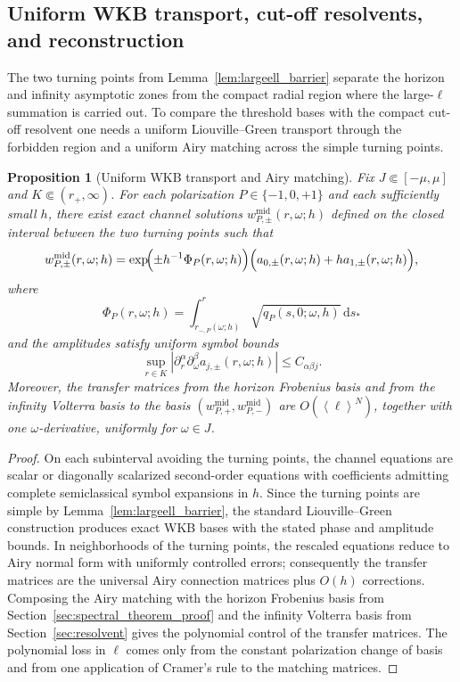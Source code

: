 \documentclass[12pt]{article}
\numberwithin{equation}{section}
\theoremstyle{plain}
\newtheorem{proposition}[theorem]{Proposition}
\theoremstyle{definition}
\theoremstyle{remark}
\newcommand{\dd}{\mathrm d}
\newcommand{\om}{\omega}
\newcommand{\angles}[1]{\left\langle #1 \right\rangle}
\newcommand{\abs}[1]{\left|#1\right|}
\begin{document}
\subsection{Uniform WKB transport, cut-off resolvents, and reconstruction}

The two turning points from Lemma~\ref{lem:largeell_barrier} separate the horizon and infinity asymptotic zones from the compact radial region where the large-$\ell$ summation is carried out.  To compare the threshold bases with the compact cut-off resolvent one needs a uniform Liouville--Green transport through the forbidden region and a uniform Airy matching across the simple turning points.

\begin{proposition}[Uniform WKB transport and Airy matching]\label{prop:largeell_wkb_matching}
Fix $J\Subset[-\mu,\mu]$ and $K\Subset(r_+,\infty)$.  For each polarization $P\in\{-1,0,+1\}$ and each sufficiently small $h$, there exist exact channel solutions $w_{P,\pm}^{\mathrm{mid}}(r,\om;h)$ defined on the closed interval between the two turning points such that
\[
   w_{P,\pm}^{\mathrm{mid}}(r,\om;h)
   =
   \exp\!\Bigl(\pm h^{-1}\Phi_P(r,\om;h)\Bigr)
   \Bigl(a_{0,\pm}(r,\om;h)+h a_{1,\pm}(r,\om;h)\Bigr),
\]
where
\[
   \Phi_P(r,\om;h)=\int_{r_{-,P}(\om;h)}^{r}\sqrt{q_P(s,0;\om,h)}\,\dd s_*
\]
and the amplitudes satisfy uniform symbol bounds
\[
   \sup_{r\in K}\abs{\partial_r^\alpha\partial_\omega^\beta a_{j,\pm}(r,\om;h)}\le C_{\alpha\beta j}.
\]
Moreover, the transfer matrices from the horizon Frobenius basis and from the infinity Volterra basis to the basis $(w_{P,+}^{\mathrm{mid}},w_{P,-}^{\mathrm{mid}})$ are $O(\angles{\ell}^{N})$, together with one $\omega$-derivative, uniformly for $\om\in J$.
\end{proposition}

\begin{proof}
On each subinterval avoiding the turning points, the channel equations are scalar or diagonally scalarized second-order equations with coefficients admitting complete semiclassical symbol expansions in $h$.  Since the turning points are simple by Lemma~\ref{lem:largeell_barrier}, the standard Liouville--Green construction produces exact WKB bases with the stated phase and amplitude bounds.  In neighborhoods of the turning points, the rescaled equations reduce to Airy normal form with uniformly controlled errors; consequently the transfer matrices are the universal Airy connection matrices plus $O(h)$ corrections.  Composing the Airy matching with the horizon Frobenius basis from Section~\ref{sec:spectral_theorem_proof} and the infinity Volterra basis from Section~\ref{sec:resolvent} gives the polynomial control of the transfer matrices.  The polynomial loss in $\ell$ comes only from the constant polarization change of basis and from one application of Cramer's rule to the matching matrices.
\end{proof}
\end{document}
